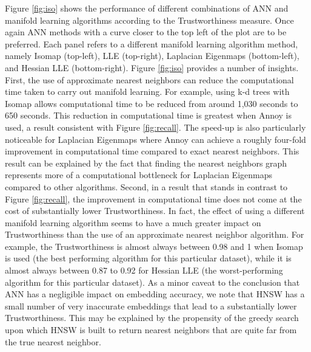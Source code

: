 \documentclass[12pt]{article}
\begin{document}
Figure \ref{fig:iso} shows the performance of different combinations of ANN and manifold learning algorithms according to the Trustworthiness measure. Once again ANN methods with a curve closer to the top left of the plot are to be preferred. Each panel refers to a different manifold learning algorithm method, namely Isomap (top-left), LLE (top-right), Laplacian Eigenmaps (bottom-left), and Hessian LLE (bottom-right). Figure \ref{fig:iso} provides a number of insights. First, the use of approximate nearest neighbors can reduce the computational time taken to carry out manifold learning. For example, using k-d trees with Isomap allows computational time to be reduced from around 1,030 seconds to 650 seconds. This reduction in computational time is greatest when Annoy is used, a result consistent with Figure \ref{fig:recall}. The speed-up is also particularly noticeable for Laplacian Eigenmaps where Annoy can achieve a roughly four-fold improvement in computational time compared to exact nearest neighbors. This result can be explained by the fact that finding the nearest neighbors graph represents more of a computational bottleneck for Laplacian Eigenmaps compared to other algorithms. Second, in a result that stands in contrast to Figure \ref{fig:recall}, the improvement in computational time does not come at the cost of substantially lower Trustworthiness. In fact, the effect of using a different manifold learning algorithm seems to have a much greater impact on Trustworthiness than the use of an approximate nearest neighbor algorithm. For example, the Trustworthiness is almost always between 0.98 and 1 when Isomap is used (the best performing algorithm for this particular dataset), while it is almost always between 0.87 to 0.92 for Hessian LLE (the worst-performing algorithm for this particular dataset). As a minor caveat to the conclusion that ANN has a negligible impact on embedding accuracy, we note that HNSW has a small number of very inaccurate embeddings that lead to a substantially lower Trustworthiness. This may be explained by the propensity of the greedy search upon which HNSW is built to return nearest neighbors that are quite far from the true nearest neighbor.
\end{document}
